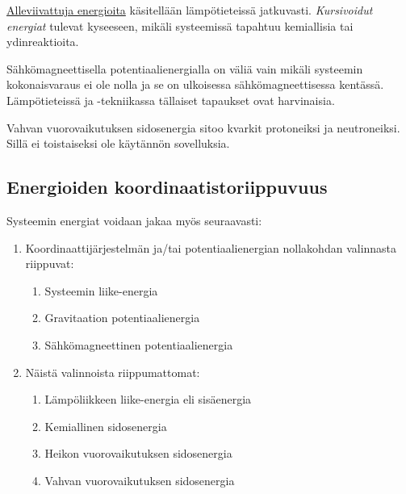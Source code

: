 \documentclass[12pt,a4paper,finnish]{book}
\begin{document}
\underline{Alleviivattuja energioita} käsitellään lämpötieteissä jatkuvasti. \textit{Kursivoidut 
energiat} tulevat kyseeseen, mikäli systeemissä tapahtuu kemiallisia tai ydinreaktioita. 

Sähkömagneettisella potentiaalienergialla on väliä vain mikäli systeemin kokonaisvaraus ei ole nolla ja 
se on ulkoisessa sähkömagneettisessa kentässä. Lämpötieteissä ja -tekniikassa tällaiset tapaukset ovat 
harvinaisia.

Vahvan vuorovaikutuksen sidosenergia sitoo kvarkit protoneiksi ja neutroneiksi. Sillä ei toistaiseksi 
ole käytännön sovelluksia.

\subsection{Energioiden koordinaatistoriippuvuus}

Systeemin energiat voidaan jakaa myös seuraavasti:

\begin{enumerate}
 \item Koordinaattijärjestelmän ja/tai potentiaalienergian nollakohdan valinnasta riippuvat:
 \begin{enumerate}
  \item Systeemin liike-energia
  \item Gravitaation potentiaalienergia
  \item Sähkömagneettinen potentiaalienergia
 \end{enumerate}
 \item Näistä valinnoista riippumattomat:
 \begin{enumerate}
  \item Lämpöliikkeen liike-energia eli sisäenergia
  \item Kemiallinen sidosenergia
  \item Heikon vuorovaikutuksen sidosenergia
  \item Vahvan vuorovaikutuksen sidosenergia
 \end{enumerate}
\end{enumerate}
\end{document}

